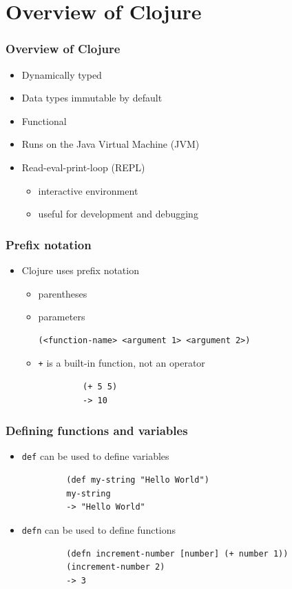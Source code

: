 \documentclass{beamer}
\begin{document}
\section{Overview of Clojure}

\begin{frame}
\frametitle{Overview of Clojure}
	\begin{itemize}
  	 \item Dynamically typed
  	 \item Data types immutable by default
  	 \item Functional
  	 \item Runs on the Java Virtual Machine (JVM)
  	 \item Read-eval-print-loop (REPL)
  	 	\begin{itemize}
  	 	\item interactive environment
  	 	\item useful for development and debugging
  	 	\end{itemize}
	 \end{itemize}
\end{frame}

\begin{frame}[fragile]
\frametitle{Prefix notation}
	\begin{itemize}
  	  \item Clojure uses prefix notation
  	  \begin{itemize}
  	 	 \item parentheses
  	 	 \item parameters
  	 	 \begin{verbatim}(<function-name> <argument 1> <argument 2>)
  	 	 \end{verbatim}
  	 	 \item \texttt{+} is a built-in function, not an operator
  	 	 \begin{verbatim}		
		 (+ 5 5)
		 -> 10
	     \end{verbatim}
	  \end{itemize}
   \end{itemize}
\end{frame}

\begin{frame}[fragile]
\frametitle{Defining functions and variables}
	\begin{itemize}
  	  \item \texttt{def} can be used to define variables
  	  \begin{verbatim}
		 (def my-string "Hello World")
		 my-string
		 -> "Hello World"
	  \end{verbatim}
  	  \item \texttt{defn} can be used to define functions
  	  \begin{verbatim}
		 (defn increment-number [number] (+ number 1))
		 (increment-number 2)
		 -> 3
	  \end{verbatim}
	\end{itemize}
\end{frame}
\end{document}
